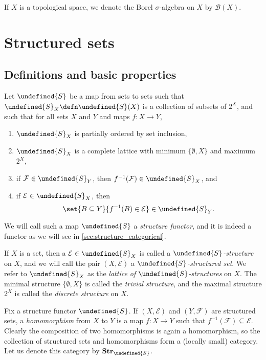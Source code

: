\documentclass[article, a4paper, 11pt, oneside]{memoir}
\let\mathfrak\undefined
\numberwithin{equation}{chapter}
\newcommand{\calE}{\mathcal{E}}
\newcommand{\calF}{\mathcal{F}}
\newcommand{\borel}{\mathcal{B}}
\newcommand{\strucS}{\mathfrak{S}}
\newcommand{\powerset}[1]{2^{#1}}
\newcommand{\ncat}[1]{\mathbf{#1}} %
\newcommand{\catStruc}[1]{\ncat{Str}_{#1}} %
\newcommand{\catStrucS}{\catStruc{\strucS}} %
\newcommand{\preim}{^{-1}}
\begin{document}
If $X$ is a topological space, we denote the Borel $\sigma$-algebra on $X$ by $\borel(X)$.



\chapter{Structured sets}


\section{Definitions and basic properties}

Let $\strucS$ be a map from sets to sets such that $\strucS_X \defn \strucS(X)$ is a collection of subsets of $\powerset{X}$, and such that for all sets $X$ and $Y$ and maps $f \colon X \to Y$,
%
\begin{enumerate}
    \item $\strucS_X$ is partially ordered by set inclusion,
    
    \item $\strucS_X$ is a complete lattice with minimum $\{\emptyset, X\}$ and maximum $2^X$,
    
    \item\label{enum:structure_def_pullback} if $\calF \in \strucS_Y$, then $f\preim(\calF) \in \strucS_X$, and
    
    \item\label{enum:structure_def_pushforward} if $\calE \in \strucS_X$, then
    \begin{equation*}
        \set{B \subseteq Y}{f\preim(B) \in \calE} \in \strucS_Y.
    \end{equation*}
\end{enumerate}
%
We will call such a map $\strucS$ a \emph{structure functor}, and it is indeed a functor as we will see in \cref{sec:structure_categorical}.

If $X$ is a set, then a $\calE \in \strucS_X$ is called a \emph{$\strucS$-structure} on $X$, and we will call the pair $(X, \calE)$ a \emph{$\strucS$-structured set}. We refer to $\strucS_X$ as the \emph{lattice of $\strucS$-structures} on $X$. The minimal structure $\{\emptyset, X\}$ is called the \emph{trivial structure}, and the maximal structure $\powerset{X}$ is called the \emph{discrete structure} on $X$.

Fix a structure functor $\strucS$. If $(X, \calE)$ and $(Y, \calF)$ are structured sets, a \emph{homomorphism} from $X$ to $Y$ is a map $f \colon X \to Y$ such that $f\preim(\calF) \subseteq \calE$. Clearly the composition of two homomorphisms is again a homomorphism, so the collection of structured sets and homomorphisms form a (locally small) category. Let us denote this category by $\catStrucS$.
\end{document}
